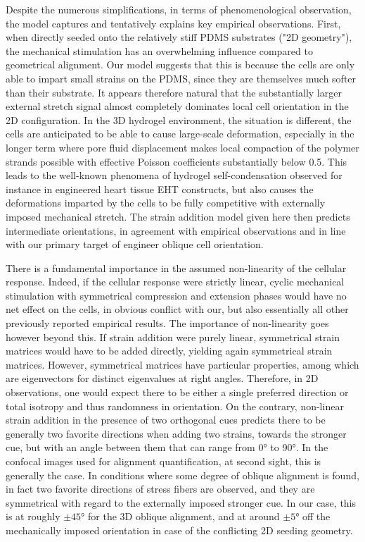 \documentclass[11pt]{amsart}
\begin{document}
Despite the numerous simplifications, in terms of phenomenological observation, the model captures and tentatively explains key empirical observations. First, when directly seeded onto the relatively stiff PDMS substrates ("2D geometry"), the mechanical stimulation has an overwhelming influence compared to geometrical alignment. Our model suggests that this is because the cells are only able to impart small strains on the PDMS, since they are themselves much softer than their substrate. It appears therefore natural that the substantially larger external stretch signal almost completely dominates local cell orientation in the 2D configuration. In the 3D hydrogel environment, the situation is different, the cells are anticipated to be able to cause large-scale deformation, especially in the longer term where pore fluid displacement makes local compaction of the polymer strands possible with effective Poisson coefficients substantially below 0.5\cite{braschler_soft_2015}. This leads to the well-known phenomena of hydrogel self-condensation\cite{sawhney_slow_2002} observed for instance in engineered heart tissue EHT constructs\cite{zimmermann_tissue_2002}, but also causes the deformations imparted by the cells to be fully competitive with externally imposed mechanical stretch. The strain addition model given here then predicts intermediate orientations, in agreement with empirical observations and in line with our primary target of engineer oblique cell orientation.

There is a fundamental importance in the assumed non-linearity of the cellular response. Indeed, if the cellular response were strictly linear, cyclic mechanical stimulation with symmetrical compression and extension phases would have no net effect on the cells, in obvious conflict with our, but also essentially all other previously reported empirical results\cite{chen_role_2018}. The importance of non-linearity goes however beyond this. If strain addition were purely linear, symmetrical strain matrices would have to be added directly, yielding again symmetrical strain matrices. However, symmetrical matrices have particular properties, among which are eigenvectors for distinct eigenvalues at right angles\cite{beresford_symmetric_1980}. Therefore, in 2D observations, one would expect there to be either a single preferred direction or total isotropy and thus randomness in orientation. On the contrary, non-linear strain addition in the presence of two orthogonal cues predicts there to be generally two favorite directions when adding two strains, towards the stronger cue, but with an angle between them that can range from 0° to 90°. In the confocal images used for alignment quantification, at second sight, this is generally the case. In conditions where some degree of oblique alignment is found, in fact two favorite directions of stress fibers are observed, and they are symmetrical with regard to the externally imposed stronger cue. In our case, this is at roughly $\pm45$° for the 3D oblique alignment, and at around $\pm5°$ off the mechanically imposed orientation in case of the conflicting 2D seeding geometry. 
\end{document}
